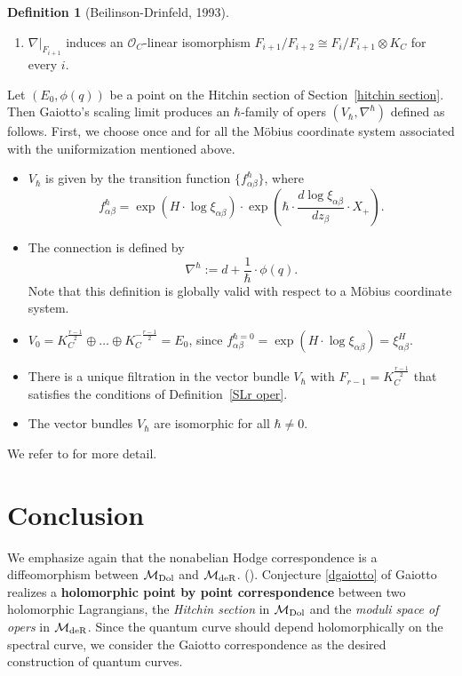 \documentclass[oneside, 11pt]{amsart}
\theoremstyle{definition}
\newtheorem{Def}[thm]{Definition}
\numberwithin{equation}{subsection}
\def\a{\alpha}
\def\b{\beta}
\def\Dol{{\text{\rm{Dol}}}}
\def\deR{{\text{\rm{deR}}}}
\newcommand{\cM}{{\mathcal{M}}}
\begin{document}
{\begin{Def}[Beilinson-Drinfeld, 1993]
\begin{enumerate}
\item $\nabla|_{F_{i+1}}$ 
induces  an $\mathcal{O}_{C}$-linear isomorphism $F_{i+1}/F_{i+2}\cong F_{i}/F_{i+1} \otimes K_C$
for every $i$.
\end{enumerate}
\end{Def}


Let $(E_0,\phi(q))$ be a point on the
Hitchin section of Section~\ref{hitchin section}.
Then Gaiotto's scaling limit produces an 
$\hbar$-family of opers $(V_{\hbar}, \nabla^{\hbar})$
defined as follows. First, we choose once and 
for all the M\"obius coordinate system
associated with the uniformization mentioned above.


\begin{itemize}

\item $V_{\hbar}$ is given by 
the transition function
$\{f_{\a\b}^{\hbar}\}$, where 
$$
f_{\a\b}^{\hbar}=\exp(H \cdot \log\xi_{\a\b}) \cdot
\exp\left(\hbar \cdot \frac{d\log \xi_{\a\b}}{dz_{\b}}\cdot X_{+}\right).
$$

\item The connection is defined by
$$
\nabla^\hbar := d + \frac{1}{\hbar} \cdot \phi(q).
$$
Note that this definition is globally valid with
respect to a M\"obius coordinate system.

\item $V_{0}=K_C^{\frac{r-1}{2}}\oplus \ldots \oplus K_C^{-\frac{r-1}{2}}=E_0$,  since $f_{\a\b}^{\hbar=0}=\exp(H\cdot \log\xi_{\a\b})=\xi_{\a\b}^{H}$.


\item There is a unique filtration in the vector bundle $V_{\hbar}$ with $F_{r-1}=K_C^{\frac{r-1}{2}}$
that satisfies the conditions  of 
Definition~\ref{SLr oper}.





\item The vector bundles $V_{\hbar}$ 
are isomorphic for all $\hbar\ne 0$. 


\end{itemize}

We refer to \cite{OD21,OD22} for more detail.






\section{Conclusion} 

We emphasize again  that the nonabelian Hodge correspondence is a diffeomorphism between 
$\cM_{\Dol}$ and $\cM_{\deR}$. 
 (\cite{D,H1,S}). Conjecture \ref{dgaiotto} of
Gaiotto  realizes a \textbf {holomorphic point by point correspondence} between two holomorphic Lagrangians,  the {\it Hitchin section} 
in $\cM_{\Dol}$ and the  {\it moduli space of opers}
in $\cM_{\deR}$. Since the 
quantum curve should depend holomorphically
on the spectral curve, we consider 
the Gaiotto correspondence as the
desired  construction 
of quantum curves. 

}
\end{document}
